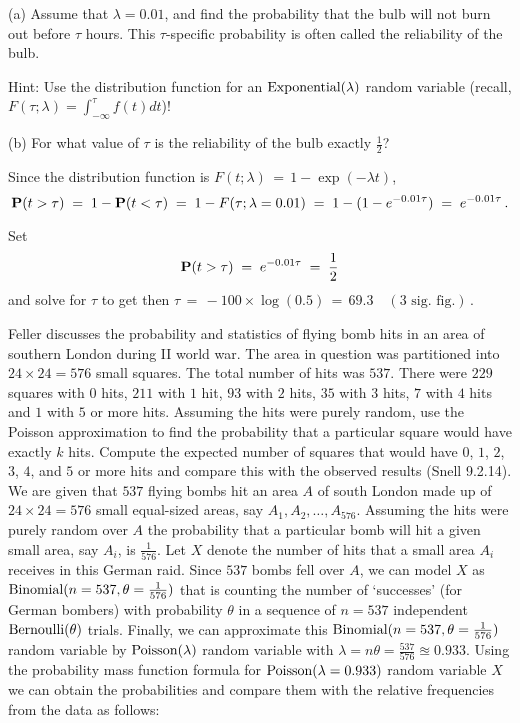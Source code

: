 \begin{ExerciseList}
\be
\item[(a)]Assume that $\lambda=0.01$, and find the probability that the
  bulb will not burn out before $\tau$ hours. This $\tau$-specific probability is often
  called the reliability of the bulb.

Hint: Use the distribution function for an $\mbox{{\rm Exponential}}(\lambda)$ random variable (recall, $F(\tau;\lambda)=\int_{-\infty}^{\tau} f(t) dt$)!

\item[(b)]For what  value of $\tau$ is the reliability of the bulb exactly $\frac{1}{2}$?
\ee
\Answer
\be
\item Since the distribution function is $F(t; \lambda) \,=\,
  1 - \exp( - \lambda t)$,
 \[\mathbf{P}(t>\tau)\;=\;1-\mathbf{P}(t<\tau)\;=\; 1 - F(\tau;\lambda=0.01) \;=\;1-(1-e^{-0.01\tau})\;=\;e^{-0.01\tau}\,.\]

\item Set  \[\mathbf{P}(t>\tau)\;=\;e^{-0.01\tau}\;=\;\frac{1}{2}\]
and solve for $\tau$ to get  then $\tau\,=\,-100\times \log(0.5)\,=\,69.3\quad (\text{3 sig. fig.})$\,.
\ee

\Exercise
Feller discusses the probability and statistics of flying bomb hits in an area of southern London during II world war.  
The area in question was partitioned into $24 \times 24 = 576$ small squares.  
The total number of hits was $537$.  
There were $229$ squares with $0$ hits, $211$ with $1$ hit, $93$ with $2$ hits, $35$ with $3$ hits, $7$ with $4$ hits and $1$ with $5$ or more hits.  
Assuming the hits were purely random, use the Poisson approximation to find the probability that a particular square would have exactly $k$ hits.  Compute the expected number of squares that would have $0$, $1$, $2$, $3$, $4$, and $5$ or more hits and compare this with the observed results (Snell 9.2.14).  
\Answer
We are given that $537$ flying bombs hit an area $A$ of south London made up of $24 \times 24=576$ small equal-sized areas, say $A_1,A_2,\ldots,A_{576}$.  
Assuming the hits were purely random over $A$ the probability that a particular bomb will hit a given small area, say $A_i$, is $\frac{1}{576}$.  
Let $X$ denote the number of hits that a small area $A_i$ receives in this German raid.  
Since $537$ bombs fell over $A$, we can model $X$ as $\mbox{{\rm Binomial}}(n=537,\theta=\frac{1}{576})$ that is counting the number of `successes' (for German bombers) with probability $\theta$ in a sequence of $n=537$ independent $\mbox{{\rm Bernoulli}}(\theta)$ trials.  
Finally, we can approximate this $\mbox{{\rm Binomial}}(n=537,\theta=\frac{1}{576})$ random variable by $\mbox{{\rm Poisson}}(\lambda)$ random variable with $\lambda=n\theta=\frac{537}{576} \approxeq 0.933$.
Using the probability mass function formula for $\mbox{{\rm Poisson}}(\lambda=0.933)$ random variable $X$ we can obtain the probabilities and compare them with the relative frequencies from the data as follows:


\end{ExerciseList}
